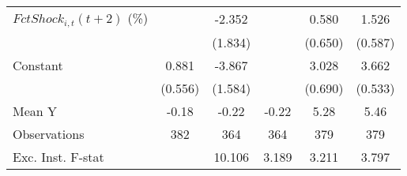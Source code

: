 {\begin{tabular}{l*{5}{c}}
\addlinespace
$ FctShock_{i,t}(t+2)$ (\%)&                     &      -2.352         &                     &       0.580         &       1.526\sym{**} \\
                    &                     &     (1.834)         &                     &     (0.650)         &     (0.587)         \\
\addlinespace
Constant            &       0.881         &      -3.867\sym{**} &                     &       3.028\sym{***}&       3.662\sym{***}\\
                    &     (0.556)         &     (1.584)         &                     &     (0.690)         &     (0.533)         \\
\midrule
Mean Y              &       -0.18         &       -0.22         &       -0.22         &        5.28         &        5.46         \\
Observations        &         382         &         364         &         364         &         379         &         379         \\
Exc. Inst. F-stat   &                     &      10.106         &       3.189         &       3.211         &       3.797         \\
\bottomrule
\end{tabular}
}
